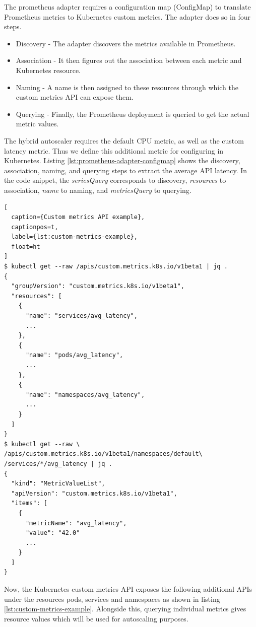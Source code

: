 The prometheus adapter requires a configuration map (ConfigMap) to translate Prometheus metrics to Kubernetes custom metrics. The adapter does so in four steps.

\begin{itemize}
    \item Discovery - The adapter discovers the metrics available in Prometheus.
    \item Association - It then figures out the association between each metric and Kubernetes resource.
    \item Naming - A name is then assigned to these resources through which the custom metrics API can expose them.
    \item Querying - Finally, the Prometheus deployment is queried to get the actual metric values.
\end{itemize}

The hybrid autoscaler requires the default CPU metric, as well as the custom latency metric. Thus we define this additional metric for configuring in Kubernetes. Listing \ref{lst:prometheus-adapter-configmap} shows the discovery, association, naming, and querying steps to extract the average API latency. In the code snippet, the \textit{seriesQuery} corresponds to discovery, \textit{resources} to association, \textit{name} to naming, and \textit{metricsQuery} to querying.

\begin{lstlisting}[
  caption={Custom metrics API example},
  captionpos=t,
  label={lst:custom-metrics-example},
  float=ht
]
$ kubectl get --raw /apis/custom.metrics.k8s.io/v1beta1 | jq .
{
  "groupVersion": "custom.metrics.k8s.io/v1beta1",
  "resources": [
    {
      "name": "services/avg_latency",
      ...
    },
    {
      "name": "pods/avg_latency",
      ...
    },
    {
      "name": "namespaces/avg_latency",
      ...
    }
  ]
}
$ kubectl get --raw \
/apis/custom.metrics.k8s.io/v1beta1/namespaces/default\
/services/*/avg_latency | jq .
{
  "kind": "MetricValueList",
  "apiVersion": "custom.metrics.k8s.io/v1beta1",
  "items": [
    {
      "metricName": "avg_latency",
      "value": "42.0"
      ...
    }
  ]
}
\end{lstlisting}

Now, the Kubernetes custom metrics API exposes the following additional APIs under the resources pods, services and namespaces as shown in listing \ref{lst:custom-metrics-example}. Alongside this, querying individual metrics gives resource values which will be used for autoscaling purposes.

